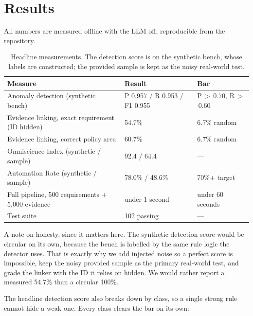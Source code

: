 \documentclass[11pt]{article}
\begin{document}
\section{Results}\label{sec:results}

All numbers are measured offline with the LLM off, reproducible from the repository.

\begin{table}[H]
\centering
\sffamily\small
\begin{tabularx}{\linewidth}{@{}Xll@{}}
\toprule
Measure & Result & Bar \\
\midrule
Anomaly detection (synthetic bench) & P 0.957 / R 0.953 / F1 0.955 & P\,$>$\,0.70, R\,$>$\,0.60 \\
Evidence linking, exact requirement (ID hidden) & 54.7\% & 6.7\% random \\
Evidence linking, correct policy area & 60.7\% & 6.7\% random \\
Omniscience Index (synthetic / sample) & 92.4 / 64.4 & --- \\
Automation Rate (synthetic / sample) & 78.0\% / 48.6\% & 70\%+ target \\
Full pipeline, 500 requirements + 5,000 evidence & under 1 second & under 60 seconds \\
Test suite & 102 passing & --- \\
\bottomrule
\end{tabularx}
\caption{Headline measurements. The detection score is on the synthetic bench, whose
labels are constructed; the provided sample is kept as the noisy real-world test.}
\end{table}

A note on honesty, since it matters here. The synthetic detection score would be circular
on its own, because the bench is labelled by the same rule logic the detector uses. That
is exactly why we add injected noise so a perfect score is impossible, keep the noisy
provided sample as the primary real-world test, and grade the linker with the ID it
relies on hidden. We would rather report a measured 54.7\% than a circular 100\%.

The headline detection score also breaks down by class, so a single strong rule cannot hide
a weak one. Every class clears the bar on its own:
\end{document}
